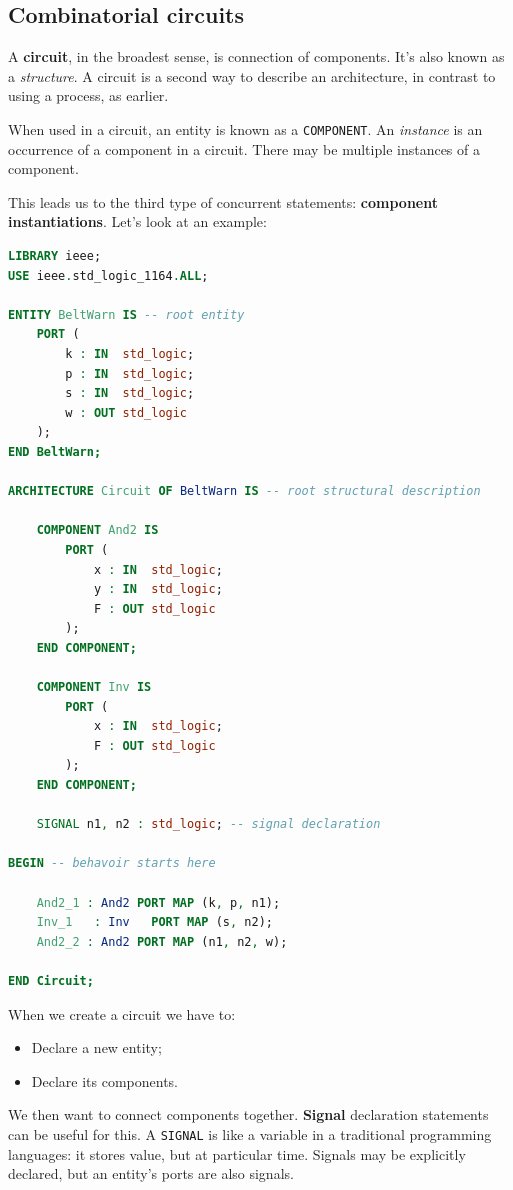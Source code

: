 \documentclass[a4paper,11pt]{article}
\begin{document}
\subsection{Combinatorial circuits}

A \textbf{circuit}, in the broadest sense, is connection of components.
It's also known as a \textit{structure}.
A circuit is a second way to describe an architecture, in contrast to using a process, as earlier.

When used in a circuit, an entity is known as a \texttt{COMPONENT}.
An \textit{instance} is an occurrence of a component in a circuit.
There may be multiple instances of a component.

This leads us to the third type of concurrent statements: \textbf{component instantiations}.
Let's look at an example:
\begin{lstlisting}[language=VHDL, style=codestyle]	
LIBRARY ieee;
USE ieee.std_logic_1164.ALL;

ENTITY BeltWarn IS -- root entity
    PORT (
        k : IN  std_logic;
        p : IN  std_logic;
        s : IN  std_logic;
        w : OUT std_logic
    );
END BeltWarn;

ARCHITECTURE Circuit OF BeltWarn IS -- root structural description

    COMPONENT And2 IS
        PORT (
            x : IN  std_logic;
            y : IN  std_logic;
            F : OUT std_logic
        );
    END COMPONENT;

    COMPONENT Inv IS
        PORT (
            x : IN  std_logic;
            F : OUT std_logic
        );
    END COMPONENT;

    SIGNAL n1, n2 : std_logic; -- signal declaration

BEGIN -- behavoir starts here

    And2_1 : And2 PORT MAP (k, p, n1);
    Inv_1   : Inv   PORT MAP (s, n2);
    And2_2 : And2 PORT MAP (n1, n2, w);

END Circuit;
\end{lstlisting}

When we create a circuit we have to:
\begin{itemize}
	\item Declare a new entity;
	\item Declare its components.
\end{itemize}

We then want to connect components together.
\textbf{\textsf{Signal}} declaration statements can be useful for this.
A \texttt{SIGNAL} is like a variable in a traditional programming languages: it stores value, but at particular time.
Signals may be explicitly declared, but an entity's ports are also signals.
\end{document}
